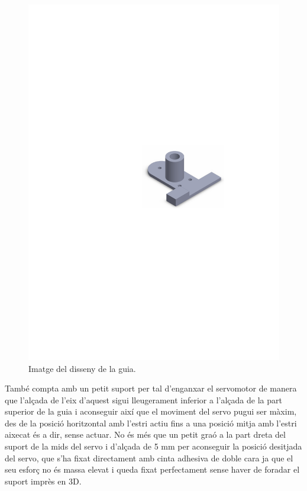\begin{figure}[H]
	\centering
	\includegraphics{guia}
	\caption{Imatge del disseny de la guia.}
	\label{fig:guia}
\end{figure}

També compta amb un petit suport per tal d’enganxar el servomotor de manera que l'alçada de l’eix d’aquest sigui lleugerament inferior a l’alçada de la part superior de la guia i aconseguir així que el moviment del servo pugui ser màxim, des de la posició horitzontal amb l’estri actiu fins a una posició mitja amb l’estri aixecat és a dir, sense actuar. No és més que un petit graó a la part dreta del suport de la mids del servo i d'alçada de 5 mm per aconseguir la posició desitjada del servo, que s’ha fixat directament amb cinta adhesiva de doble cara ja que el seu esforç no és massa elevat i queda fixat perfectament sense haver de foradar el suport imprès en 3D. 

